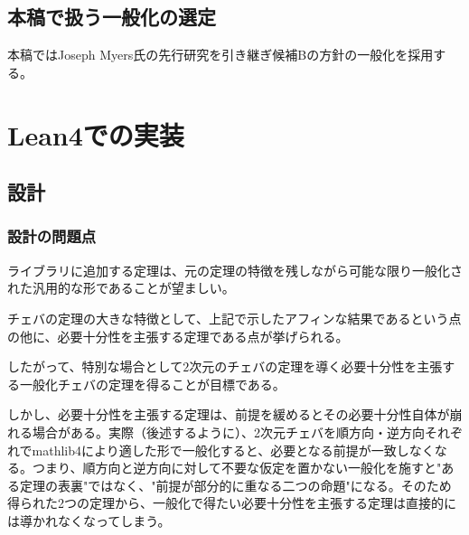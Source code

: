 \documentclass[a4paper,12pt]{bxjsbook}
\newlength{\customindent}
\newenvironment{body}{
  \par
  \begingroup
  \setlength{\leftskip}{\customindent}
  \setlength{\rightskip}{0pt}
  \setlength{\parindent}{1em}
  \setlength{\displayindent}{\customindent}
  \setlength{\displaywidth}{\dimexpr\linewidth-\customindent\relax}
}{
  \par
  \endgroup
}
\theoremstyle{theorem}
\begin{document}
    \section{本稿で扱う一般化の選定}
    \begin{body}
        本稿ではJoseph Myers氏の先行研究を引き継ぎ候補Bの方針の一般化を採用する。
    \end{body}

    

    \chapter{Lean4での実装}

    \section{設計}
    \subsection{設計の問題点}
    \begin{body}
        \indent ライブラリに追加する定理は、元の定理の特徴を残しながら可能な限り一般化された汎用的な形であることが望ましい。
        
        \indent チェバの定理の大きな特徴として、上記で示したアフィンな結果であるという点の他に、必要十分性を主張する定理である点が挙げられる。
        
        \indent したがって、特別な場合として$2$次元のチェバの定理を導く必要十分性を主張する一般化チェバの定理を得ることが目標である。

        \indent しかし、必要十分性を主張する定理は、前提を緩めるとその必要十分性自体が崩れる場合がある。実際（後述するように）、2次元チェバを順方向・逆方向それぞれでmathlib4により適した形で一般化すると、必要となる前提が一致しなくなる。つまり、順方向と逆方向に対して不要な仮定を置かない一般化を施すと"ある定理の表裏"ではなく、"前提が部分的に重なる二つの命題"になる。そのため得られた2つの定理から、一般化で得たい必要十分性を主張する定理は直接的には導かれなくなってしまう。

    \end{body}
\end{document}
